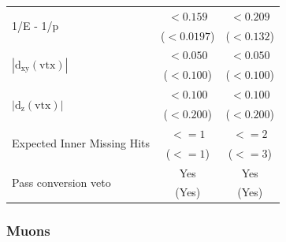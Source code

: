 \begin{table}[htb]
\begin{tabular}{ l c c}
        \multirow{2}{*}{1/E - 1/p}                              & $< 0.159   $                                 & $< 0.209    $                              \\
                                                                & ($< 0.0197   $)                              & ($< 0.132    $)                            \\\cline{2-3}
        \multirow{2}{*}{$|\mathrm{d_{xy}(vtx)}|$}               & $< 0.050   $                                 & $< 0.050 $                                 \\
                                                                & ($< 0.100   $)                               & ($< 0.100   $)                             \\\cline{2-3}
        \multirow{2}{*}{$|\mathrm{d_{z}(vtx)}|$}                & $< 0.100   $              & $< 0.100 $            \\
                                                                & ($< 0.200   $)                               & ($< 0.200   $)                             \\\cline{2-3}
        \multirow{2}{*}{Expected Inner Missing Hits}            & $<= 1$                                       & $<= 2 $                                    \\
                                                                & ($<= 1$)                                     & ($<= 3$)                                   \\\cline{2-3}
        \multirow{2}{*}{Pass conversion veto}                   & Yes                                          & Yes                                        \\
                                                                & (Yes)                                        & (Yes)                                      \\
        \hline\hline
    \end{tabular}
    \label{tab:ElectronIDTight}
\end{table}



\subsubsection{Muons}

